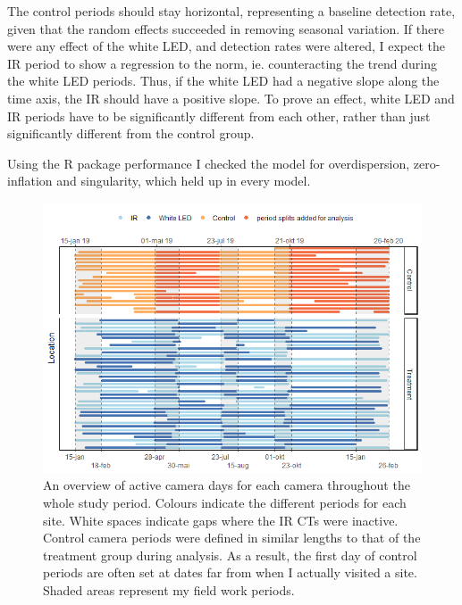 
The control periods should stay horizontal, representing a baseline detection rate, given that the random effects succeeded in removing seasonal variation. 
If there were any effect of the white LED, and detection rates were altered, I expect the IR period to show a regression to the norm, ie. counteracting the trend during the white LED periods.
Thus, if the white LED had a negative slope along the time axis, the IR should have a positive slope. %
To prove an effect, white LED and IR periods have to be significantly different from each other, rather than just significantly different from the control group.

Using the R package performance \autocite{R-performance} I checked the model for overdispersion, zero-inflation and singularity, which held up in every model.


\begin{figure}
		\centering
		\includegraphics[width=\textwidth]{../R/FLM_notebook_files/figure-gfm/effort-facet-1.png}	
\caption[An overview of active camera days]
{An overview of active camera days for each camera throughout the whole study period.  \small %
Colours indicate the different periods for each site. White spaces indicate gaps where the IR CTs were inactive. Control camera periods were defined in similar lengths to that of the treatment group during analysis. As a result, the first day of control periods are often set at dates far from when I actually visited a site. Shaded areas represent my field work periods.}
\label{fig:timeseries}
\end{figure}

